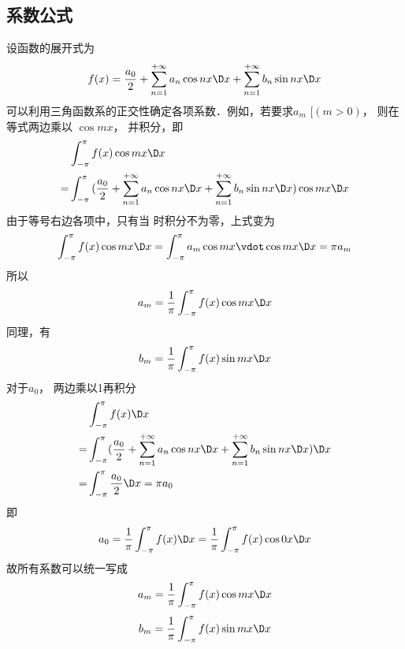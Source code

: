 \subsection{系数公式}

设函数的展开式为
\begin{equation}
f( x ) = \frac{{{a_0}}}{2} + \sum\limits_{n = 1}^{ + \infty } {{a_n}\cos nx \D x} + \sum\limits_{n = 1}^{ + \infty } {{b_n}\sin nx \D x} 
\end{equation}
可以利用三角函数系的正交性确定各项系数．例如，若要求${a_m}$ $[(m > 0)$， 则在等式两边乘以 $\cos mx$， 并积分，即
\begin{equation}\begin{split}
&\int_{ - \pi }^\pi {f( x )\cos mx \D x}\\ 
= &\int_{ - \pi }^\pi {(\frac{{{a_0}}}{2} + \sum\limits_{n = 1}^{ + \infty } {{a_n}\cos nx \D x} + \sum\limits_{n = 1}^{ + \infty } {{b_n}\sin nx \D x} )\cos mx \D x}
\end{split}\end{equation}
由于等号右边各项中，只有当 时积分不为零，上式变为
\begin{equation}
\int_{ - \pi }^\pi {f( x )\cos mx \D x} = \int_{ - \pi }^\pi {{a_m}\cos mx \vdot \cos mx \D x} = \pi {a_m}
\end{equation}
所以
\begin{equation}
{a_m} = \frac{1}{\pi }\int_{ - \pi }^\pi {f( x )\cos mx \D x}
\end{equation}
同理，有
\begin{equation}
{b_m} = \frac{1}{\pi }\int_{ - \pi }^\pi {f( x )\sin mx \D x}
\end{equation}
对于${a_0}$， 两边乘以1再积分
\begin{equation}\begin{aligned}
&\int_{-\pi}^\pi {f(x) \D x}\\  
= &\int_{-\pi}^\pi  (\frac{a_0}{2} + \sum\limits_{n = 1}^{+\infty} {a_n}\cos nx \D x  + \sum\limits_{n = 1}^{+\infty} {{b_n}\sin nx \D x}) \D x \\
= &\int_{ - \pi }^\pi  {\frac{{{a_0}}}{2} \D x}  = \pi {a_0}\\
\end{aligned}\end{equation}
即
\begin{equation}
{a_0} = \frac{1}{\pi }\int_{ - \pi }^\pi {f( x ) \D x} = \frac{1}{\pi }\int_{ - \pi }^\pi {f( x )\cos 0x \D x}
\end{equation}
故所有系数可以统一写成
\begin{equation}
{a_m} = \frac{1}{\pi }\int_{ - \pi }^\pi  {f( x )\cos mx \D x}
\end{equation}
\begin{equation}
{b_m} = \frac{1}{\pi }\int_{ - \pi }^\pi {f( x )\sin mx \D x}
\end{equation}

